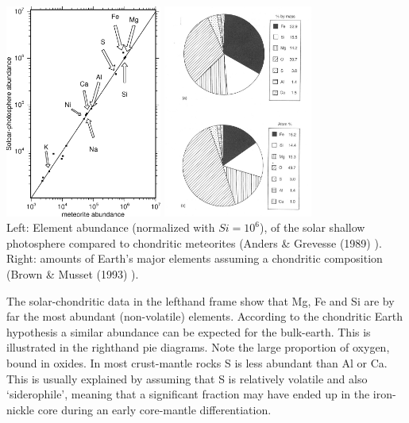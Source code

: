 \begin{center}
\includegraphics[height=7cm]{images/gravity/photosphere-meteoritic-restricted}
\includegraphics[height=7cm]{images/gravity/brown-musset_fig5-6} \\
{\captionfont
Left:
Element abundance (normalized with $Si=10^6$),
of the solar shallow photosphere compared to
chondritic meteorites (Anders \& Grevesse (1989) \cite{angr89}).
Right:
amounts of Earth's major elements assuming a chondritic
composition (Brown \& Musset (1993) \cite{brmu93}). 
}
\end{center}


The solar-chondritic data in the lefthand frame show that Mg, Fe and Si are 
by far the most abundant (non-volatile) elements.
According to the chondritic Earth hypothesis a similar abundance can be expected
for the bulk-earth.
This is illustrated in the righthand pie diagrams.
Note the large proportion of oxygen, bound in oxides.
In most crust-mantle rocks S is less abundant than Al or Ca.
This is usually explained by assuming that S is relatively volatile and 
also `siderophile', meaning that a significant fraction may have ended up in the
iron-nickle core during an early core-mantle differentiation.

